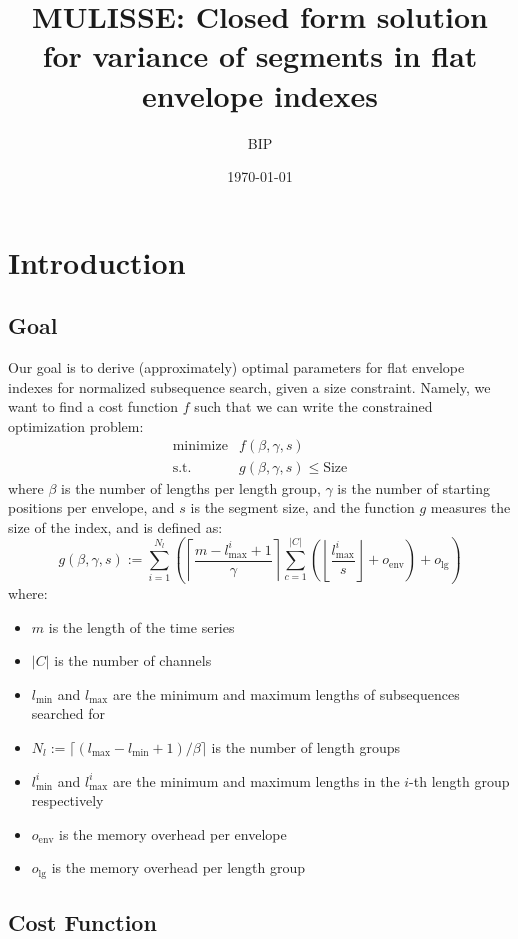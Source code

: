 \documentclass[12pt,a4paper]{article}
\title{MULISSE: Closed form solution for variance of segments in flat envelope indexes}
\author{BIP}
\date{\today}
\begin{document}
\maketitle

\section{Introduction}

\subsection{Goal}

Our goal is to derive (approximately) optimal parameters for flat envelope indexes for normalized subsequence search, given a size constraint. Namely, we want to find a cost function $f$ such that we can write the constrained optimization problem:
$$\begin{array}{rl}
    \text{minimize} & f(\beta, \gamma, s) \\[4pt]
    \text{s.t.} & g(\beta, \gamma, s) \le \text{Size}
\end{array}$$
where $\beta$ is the number of lengths per length group, $\gamma$ is the number of starting positions per envelope, and $s$ is the segment size, and the function $g$ measures the size of the index, and is defined as:
$$g(\beta,\gamma,s) := \sum_{i=1}^{N_l}\left(\left\lceil\frac{m-l_{\max}^i+1}{\gamma}\right\rceil\sum_{c=1}^{|C|}\left(\left\lfloor\frac{l_{\max}^i}{s}\right\rfloor+o_\text{env}\right)+o_\text{lg}\right)$$
where:
\begin{itemize}
    \item $m$ is the length of the time series
    \item $|C|$ is the number of channels
    \item $l_{\min}$ and $l_{\max}$ are the minimum and maximum lengths of subsequences searched for
    \item $N_l:=\lceil(l_{\max}-l_{\min}+1)/\beta\rceil$ is the number of length groups
    \item $l_{\min}^i$ and $l_{\max}^i$ are the minimum and maximum lengths in the $i$-th length group respectively
    \item $o_\text{env}$ is the memory overhead per envelope
    \item $o_\text{lg}$ is the memory overhead per length group
\end{itemize}

\subsection{Cost Function}
\end{document}
